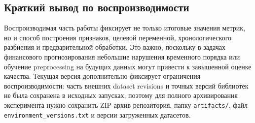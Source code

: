 \subsection*{Краткий вывод по воспроизводимости}

Воспроизводимая часть работы фиксирует не только итоговые значения метрик, но и способ построения признаков, целевой переменной, хронологического разбиения и предварительной обработки. Это важно, поскольку в задачах финансового прогнозирования небольшие нарушения временного порядка или обучение preprocessing на будущих данных могут привести к завышенной оценке качества. Текущая версия дополнительно фиксирует ограничения воспроизводимости: часть внешних dataset revisions и точных версий библиотек не была сохранена в исходных запусках, поэтому для полного архивирования эксперимента нужно сохранить ZIP-архив репозитория, папку \texttt{artifacts/}, файл \texttt{environment\_versions.txt} и версии загруженных датасетов.
